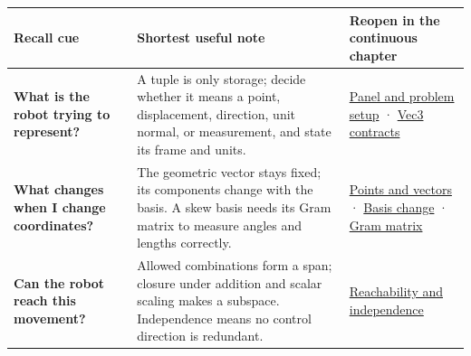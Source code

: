 {\def\LTcaptype{none} %
\begin{longtable}[]{@{}
  >{\raggedright\arraybackslash}p{}
  >{\raggedright\arraybackslash}p{}
  >{\raggedright\arraybackslash}p{}@{}}
\toprule\noalign{}
\begin{minipage}[b]{\linewidth}\raggedright
Recall cue
\end{minipage} & \begin{minipage}[b]{\linewidth}\raggedright
Shortest useful note
\end{minipage} & \begin{minipage}[b]{\linewidth}\raggedright
Reopen in the continuous chapter
\end{minipage} \\
\midrule\noalign{}
\endhead
\bottomrule\noalign{}
\endlastfoot
\textbf{What is the robot trying to represent?} & A tuple is only storage; decide whether it means a point, displacement, direction, unit normal, or measurement, and state its frame and units. & \href{Continuous\%20Notes/Computing\%20Foundations\%20-\%20From\%20Bits\%20to\%20C++\%20and\%20Systems\%20APIs\#The\%20panel\%20gives\%20us\%20a\%20reason\%20to\%20learn/}{Panel and problem setup} · \href{Continuous\%20Notes/Computing\%20Foundations\%20-\%20From\%20Bits\%20to\%20C++\%20and\%20Systems\%20APIs\#Three\%20stored\%20numbers\%20are\%20not\%20the\%20complete\%20contract/}{Vec3 contracts} \\
\textbf{What changes when I change coordinates?} & The geometric vector stays fixed; its components change with the basis. A skew basis needs its Gram matrix to measure angles and lengths correctly. & \href{Continuous\%20Notes/Computing\%20Foundations\%20-\%20From\%20Bits\%20to\%20C++\%20and\%20Systems\%20APIs\#An\%20arrow\%20is\%20not\%20the\%20address\%20written\%20beside\%20it/}{Points and vectors} · \href{Continuous\%20Notes/Computing\%20Foundations\%20-\%20From\%20Bits\%20to\%20C++\%20and\%20Systems\%20APIs\#A\%20basis\%20is\%20a\%20measuring\%20arrangement,\%20not\%20the\%20vector\%20itself/}{Basis change} · \href{Continuous\%20Notes/Computing\%20Foundations\%20-\%20From\%20Bits\%20to\%20C++\%20and\%20Systems\%20APIs\#A\%20Gram\%20matrix\%20remembers\%20the\%20geometry\%20of\%20a\%20slanted\%20basis/}{Gram matrix} \\
\textbf{Can the robot reach this movement?} & Allowed combinations form a span; closure under addition and scalar scaling makes a subspace. Independence means no control direction is redundant. & \href{Continuous\%20Notes/Computing\%20Foundations\%20-\%20From\%20Bits\%20to\%20C++\%20and\%20Systems\%20APIs\#The\%20reachable\%20movements\%20form\%20a\%20vector\%20space/}{Reachability and independence} \\

\end{longtable}}

